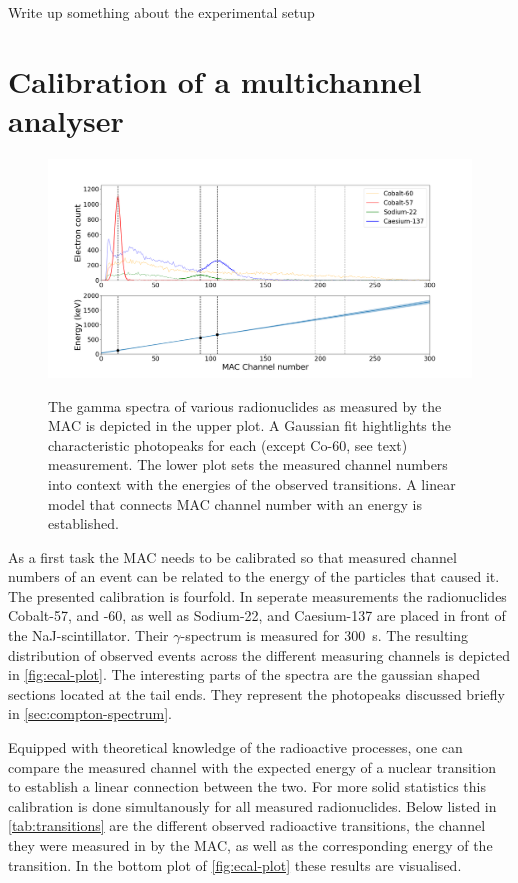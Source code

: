 
\todo Write up something about the experimental setup

\section{Calibration of a multichannel analyser}
\label{sec:ecal}

\begin{figure}
	\label{fig:ecal-plot}
	\includegraphics[width=1.0\textwidth]{./fig/ecal-plot.png}
	\caption{}{The gamma spectra of various radionuclides as measured by the MAC
	is depicted in the upper plot. A Gaussian fit hightlights the characteristic
	photopeaks for each (except Co-60, see text) measurement. The lower plot
	sets the measured channel numbers into context with the energies of the
	observed transitions. A linear model that connects MAC channel number with an
	energy is established.}
\end{figure}

As a first task the MAC needs to be calibrated so that measured channel numbers of an
event can be related to the energy of the particles that caused it. The presented
calibration is fourfold. In seperate measurements the radionuclides Cobalt-57, and
-60, as well as Sodium-22, and Caesium-137 are placed in front of the
NaJ-scintillator. Their $\gamma$-spectrum is measured for \SI{300}{\second}. The
resulting distribution of observed events across the different measuring channels is
depicted in \autoref{fig:ecal-plot}. The interesting parts of the spectra are the
gaussian shaped sections located at the tail ends. They represent the photopeaks
discussed briefly in \autoref{sec:compton-spectrum}.

Equipped with theoretical knowledge of the radioactive processes, one can compare the
measured channel with the expected energy of a nuclear transition to establish a
linear connection between the two. For more solid statistics this calibration is done
simultanously for all measured radionuclides. Below listed in
\autoref{tab:transitions} are the different observed radioactive transitions, the
channel they were measured in by the MAC, as well as the corresponding energy of the
transition. In the bottom plot of \autoref{fig:ecal-plot} these results are
visualised.
